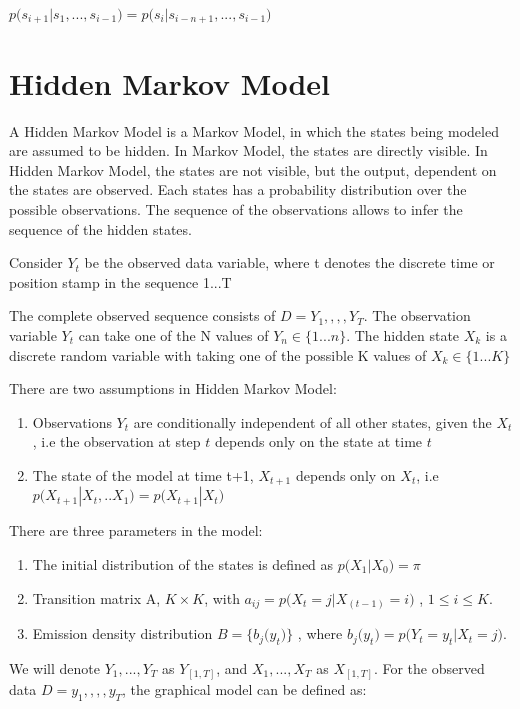 \documentclass{article} %
\begin{document}
$p\big(s_{i+1}|s_1, . . . , s_{i−1}\big) = p\big(s_i|s_{i-n+1}, . . . , s_{i-1}\big)$
\section{Hidden Markov Model}
\label{HMM}

A Hidden Markov Model is a Markov Model, in which the states being modeled are assumed to be hidden. In Markov Model, the states are directly visible. In Hidden Markov Model, the states are not visible, but the output, dependent on the states are observed. Each states has a probability distribution over the possible observations. The sequence of the observations allows to infer the sequence of the hidden states. 

Consider \(Y_t\) be the observed data variable, where t denotes the discrete time or position stamp in the sequence 1...T

The complete observed sequence consists of \(D ={Y_1,,,,Y_T}\). The observation variable $Y_t$ can take one of the N values of \(Y_n \in \{1...n\}\). The hidden state \(X_k\) is a discrete random variable with taking one of the possible K values of \(X_k \in \{1...K\}\)

There are two assumptions in Hidden Markov Model:
\begin{enumerate}
\item Observations $Y_t$ are conditionally independent of all other states, given the \(X_t\), i.e the observation at step \(t\) depends only on the state at time \(t\)
\item The state of the model at time t+1, \(X_{t+1}\) depends only on \(X_t\), i.e 
\( p\big(X_{t+1}|X_t,..X_1\big) = p\big(X_{t+1}|X_t\big) \)
\end{enumerate}

There are three parameters in the model:
\begin{enumerate}
\item The initial distribution of the states is defined as \(p\big(X_1|X_0 \big) = \pi\)
\item Transition matrix A, \(K \times K \), with \(a_{ij} = p\big(X_t=j|X_(t-1)=i\big)\) , \(1\leq i \leq K \).
\item Emission density distribution \(B = \{b_{j}\big(y_t\big)\}\) , where \(b_{j}\big(y_t\big) = p\big(Y_t=y_t|X_t=j\big)\).
\end{enumerate}

We will denote \(Y_1,...,Y_T\) as \(Y_{[1,T]}\), and \(X_1,...,X_T\) as \(X_{[1,T]}\). For the observed data \(D ={y_1,,,,y_T}\), the graphical model can be defined as:
\end{document}
